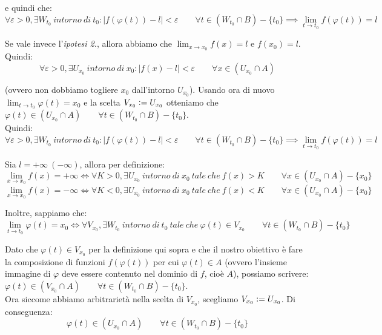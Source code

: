 \documentclass{article}
\begin{document}
\noindent e quindi che:
\begin{equation*}
    \forall \varepsilon > 0, \exists W_{t_0} \ intorno \ di \ t_0 : |f(\varphi(t)) - l| < \varepsilon \qquad \forall t \in (W_{t_0} \cap B) - \{t_0\} \implies \lim_{t \to t_0} f(\varphi(t)) = l
\end{equation*}

\noindent Se vale invece l'\textit{ipotesi 2.}, allora abbiamo che $\lim_{x \to x_0} f(x) = l$ e $f(x_0) = l$. Quindi:
\begin{equation*}
    \forall \varepsilon > 0, \exists U_{x_0} \ intorno \ di \ x_0 : |f(x) - l| < \varepsilon \qquad \forall x \in (U_{x_0} \cap A)
\end{equation*}

\noindent (ovvero non dobbiamo togliere $x_0$ dall'intorno $U_{x_0}$). Usando ora di nuovo $\lim_{t \to t_0} \varphi(t) = x_0$ e la scelta $V_{x_0} \vcentcolon = U_{x_0}$ otteniamo che $\varphi(t) \in (U_{x_0} \cap A) \qquad \forall t \in (W_{t_0} \cap B) - \{t_0\}$.\\
Quindi:
\begin{equation*}
    \forall \varepsilon > 0, \exists W_{t_0} \ intorno \ di \ t_0 : |f(\varphi(t)) - l| < \varepsilon \qquad \forall t \in (W_{t_0} \cap B) - \{t_0\} \implies \lim_{t \to t_0} f(\varphi(t)) = l
\end{equation*}

\noindent Sia $l = +\infty \ (-\infty)$, allora per definizione:
\begin{equation*}
    \lim_{x \to x_0} f(x) = +\infty \iff \forall K > 0, \exists U_{x_0} \ intorno \ di \ x_0 \ tale \ che \ f(x) > K \qquad \forall x \in (U_{x_0} \cap A) - \{x_0\}
\end{equation*}
\begin{equation*}
    \lim_{x \to x_0} f(x) = -\infty \iff \forall K < 0, \exists U_{x_0} \ intorno \ di \ x_0 \ tale \ che \ f(x) < K \qquad \forall x \in (U_{x_0} \cap A) - \{x_0\}
\end{equation*}

\noindent Inoltre, sappiamo che:
\begin{equation*}
    \lim_{t \to t_0} \varphi(t) = x_0 \iff \forall V_{x_0}, \exists W_{t_0} \ intorno \ di \ t_0 \ tale \ che \ \varphi(t) \in V_{x_0} \qquad \forall t \in (W_{t_0} \cap B) - \{t_0\}
\end{equation*}

\noindent Dato che $\varphi(t) \in V_{x_0}$ per la definizione qui sopra e che il nostro obiettivo è fare la composizione di funzioni $f(\varphi(t))$ per cui $\varphi(t) \in A$ (ovvero l'insieme immagine di $\varphi$ deve essere contenuto nel dominio di $f$, cioè $A$), possiamo scrivere: $\varphi(t) \in (V_{x_0} \cap A) \qquad \forall t \in (W_{t_0} \cap B) - \{t_0\}$.\\
Ora siccome abbiamo arbitrarietà nella scelta di $V_{x_0}$, scegliamo $V_{x_0} \vcentcolon = U_{x_0}$. Di conseguenza:
\begin{equation*}
    \varphi(t) \in (U_{x_0} \cap A) \qquad \forall t \in (W_{t_0} \cap B) - \{t_0\}
\end{equation*}
\end{document}
